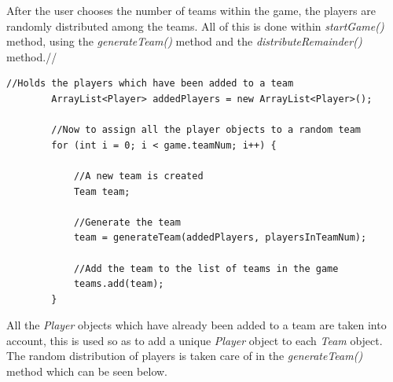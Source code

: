 \documentclass[a4paper,12pt]{extarticle}
\begin{document}
After the user chooses the number of teams within the game, the players are randomly distributed among the teams. All of this is done within \textit{startGame()} method, using the \textit{generateTeam()} method and the \textit{distributeRemainder()} method.//

\begin{lstlisting}
//Holds the players which have been added to a team
        ArrayList<Player> addedPlayers = new ArrayList<Player>();

        //Now to assign all the player objects to a random team
        for (int i = 0; i < game.teamNum; i++) {

            //A new team is created
            Team team;

            //Generate the team
            team = generateTeam(addedPlayers, playersInTeamNum);

            //Add the team to the list of teams in the game
            teams.add(team);
        }
\end{lstlisting}
\vspace{-1mm}

All the \textit{Player} objects which have already been added to a team are taken into account, this is used so as to add a unique \textit{Player} object to each \textit{Team} object. The random distribution of players is taken care of in the \textit{generateTeam()} method which can be seen below.\\
\end{document}

